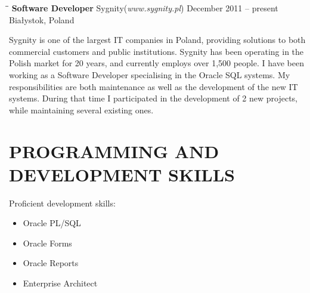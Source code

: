 \documentclass{res}
\begin{document}
\begin{resume}
   \begin{tabbing}
   \hspace{2.3in}\= \hspace{2.6in}\= \kill %
    {\bf Software Developer} \>Sygnity(\textit{www.sygnity.pl}) \>December 2011 -- present\\
                             \>Białystok, Poland
   \end{tabbing}\vspace{-20pt}      %
   Sygnity is one of the largest IT companies in Poland, providing solutions to both commercial customers and public institutions.
   Sygnity has been operating in the Polish market for 20 years, and currently employs over 1,500 people.
   I have been working as a Software Developer specialising in the Oracle SQL systems. My responsibilities are both maintenance as well as
   the development of the new IT systems.
   During that time I participated in the development of 2 new projects, while maintaining several existing ones.


\section{PROGRAMMING AND DEVELOPMENT SKILLS}
	Proficient development skills:
	\begin{itemize}
		\item Oracle PL/SQL
		\item Oracle Forms
		\item Oracle Reports
		\item Enterprise Architect
	\end{itemize}


\end{resume}
\end{document}
